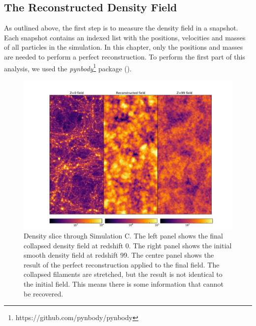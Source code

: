 
\subsection{The Reconstructed Density Field}

As outlined above, the first step is to measure the density field in a snapshot. Each snapshot contains an indexed list with the positions, velocities and masses of all particles in the simulation. In this chapter, only the positions and masses are needed to perform a perfect reconstruction. To perform the first part of this analysis, we used the \textit{pynbody}\footnote{https://github.com/pynbody/pynbody} package (\cite{2013ascl.soft05002P}). 

\begin{figure}
    \centering
    \includegraphics[width=1\columnwidth]{images/densityFields/densityField.pdf}%
    
    \caption{
    Density slice through Simulation C. The left panel shows the final collapsed density field at redshift 0. The right panel shows the initial smooth density field at redshift 99. The centre panel shows the result of the perfect reconstruction applied to the final field. The collapsed filaments are stretched, but the result is not identical to the initial field. This means there is some information that cannot be recovered.
    }
    
    \label{im:1}
\end{figure}


